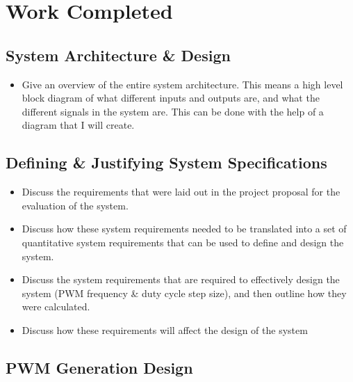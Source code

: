 \chapter{Work Completed}\label{C:work}

\section{System Architecture \& Design}

\begin{itemize}

    \item 
    Give an overview of the entire system architecture. This means a high level block diagram of what different inputs and outputs are, and what the different signals in the system are. This can be done with the help of a diagram that I will create. 
    

\end{itemize}

\section{Defining \& Justifying System Specifications}

\begin{itemize}

    \item 
    Discuss the requirements that were laid out in the project proposal for the evaluation of the system. 

    \item 
    Discuss how these system requirements needed to be translated into a set of quantitative system requirements that can be used to define and design the system.
    
    \item 
    Discuss the system requirements that are required to effectively design the system (PWM frequency \& duty cycle step size), and then outline how they were calculated.
    
    \item 
    Discuss how these requirements will affect the design of the system

\end{itemize}

\section{PWM Generation Design}

